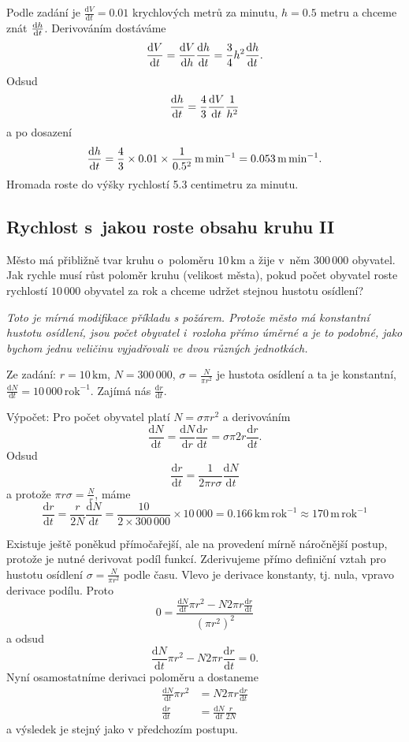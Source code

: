 \reseni

Podle zadání je $\frac{\mathrm dV}{\mathrm dt}=0.01$ krychlových metrů za minutu, $h=0.5$ metru a chceme znát $\frac{\mathrm{d}h}{\mathrm{d}t}$. Derivováním dostáváme
$$\frac{\mathrm{d}V}{\mathrm{d}t} = \frac{\mathrm{d}V}{\mathrm{d}h} \frac{\mathrm{d}h}{\mathrm{d}t} = \frac 34 h^2 \frac{\mathrm{d}h}{\mathrm{d}t}.$$
Odsud
$$\frac{\mathrm{d}h}{\mathrm{d}t} = \frac 43 \frac{\mathrm{d}V}{\mathrm{d}t} \frac 1{h^2}$$
a po dosazení
$$\frac{\mathrm{d}h}{\mathrm{d}t} = \frac 43 \times 0.01 \times \frac 1{0.5^2} \,\mathrm{m}\,\mathrm{min}^{-1}=0.053 \,\mathrm{m}\,\mathrm{min}^{-1}.$$
Hromada roste do výšky rychlostí 5.3 centimetru za minutu.

\konec

\stranka
{}
\subsection{Rychlost s jakou roste obsahu kruhu II}
Město má přibližně tvar kruhu o poloměru $10\,\mathrm{km}$ a žije v něm $300\,000$ obyvatel. Jak rychle musí růst poloměr kruhu (velikost
města), pokud počet obyvatel roste rychlostí $10\,000$ obyvatel za rok
a chceme udržet stejnou hustotu osídlení?


\textit{Toto je mírná modifikace příkladu s požárem. Protože město má konstantní hustotu osídlení, jsou počet obyvatel i rozloha přímo úměrné a je to podobné, jako bychom jednu veličinu vyjadřovali ve dvou různých jednotkách.} 

\reseni
Ze zadání: $r=10\,\mathrm{km}$, $N=300\,000$, $\sigma=\frac{N}{\pi r^2}$ je hustota osídlení a ta je konstantní, $\frac {\mathrm dN}{\mathrm dt}=10\,000 \,\text{rok}^{-1}$. Zajímá nás $\frac{\mathrm dr}{\mathrm dt}$.

Výpočet: Pro počet obyvatel platí $N=\sigma \pi r^2$ a derivováním $$\frac{\mathrm dN}{\mathrm dt}
=\frac{\mathrm dN}{\mathrm dr}\frac{\mathrm dr}{\mathrm dt}=\sigma \pi 2r\frac{\mathrm dr}{\mathrm dt}.$$ Odsud
$$
\frac{\mathrm dr}{\mathrm dt}=\frac 1{2\pi r\sigma}\frac{\mathrm dN}{\mathrm dt}
$$
a protože $\pi r\sigma=\frac Nr$, máme
$$
\frac{\mathrm dr}{\mathrm dt}=\frac {r}{2N}\frac{\mathrm dN}{\mathrm dt}=\frac {10}{2\times 300\,000}\times 10\,000=0.166 \,\mathrm{km}\,\mathrm{rok}^{-1}\approx 170\,\mathrm m\,\mathrm{rok}^{-1}
$$

Existuje ještě poněkud přímočařejší, ale na provedení mírně náročnější postup, protože je nutné derivovat podíl funkcí. Zderivujeme přímo definiční vztah pro hustotu osídlení $\sigma=\frac{N}{\pi r^2}$ podle času. Vlevo je derivace konstanty, tj. nula, vpravo derivace podílu. Proto
$$0=\frac{\frac{\mathrm dN}{\mathrm dt} \pi r^2 - N2\pi r\frac{\mathrm dr}{\mathrm dt}}{(\pi r^2)^2}$$
a odsud
$$\frac{\mathrm dN}{\mathrm dt} \pi r^2 - N2\pi r\frac{\mathrm dr}{\mathrm dt}=0.$$
Nyní osamostatníme derivaci poloměru a dostaneme
$$
\begin{aligned}
\frac{\mathrm dN}{\mathrm dt} \pi r^2 &= N2\pi r\frac{\mathrm dr}{\mathrm dt}\\
\frac{\mathrm dr}{\mathrm dt} &= \frac{\mathrm dN}{\mathrm dt} \frac r{2N} 
\end{aligned}
$$
a výsledek je stejný jako v předchozím postupu.

